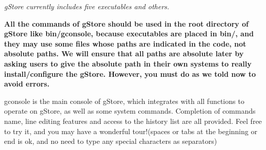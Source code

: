 \documentclass[titlepage, a4paper, 12pt]{article}
\begin{document}
\textit{gStore currently includes five executables and others.}

\textbf{All the commands of gStore should be used in the root directory of gStore like bin/gconsole, because executables are placed in bin/, and they may use some files whose paths are indicated in the code, not absolute paths. We will ensure that all paths are absolute later by asking users to give the absolute path in their own systems to really install/configure the gStore. However, you must do as we told now to avoid errors.}


gconsole is the main console of gStore, which integrates with all functions to operate on gStore, as well as some system commands.  Completion of commands name, line editing features and access to the history list are all provided. Feel free to try it, and you may have a wonderful tour!(spaces or tabs at the beginning or end is ok, and no need to type any special characters as separators)
\end{document}
